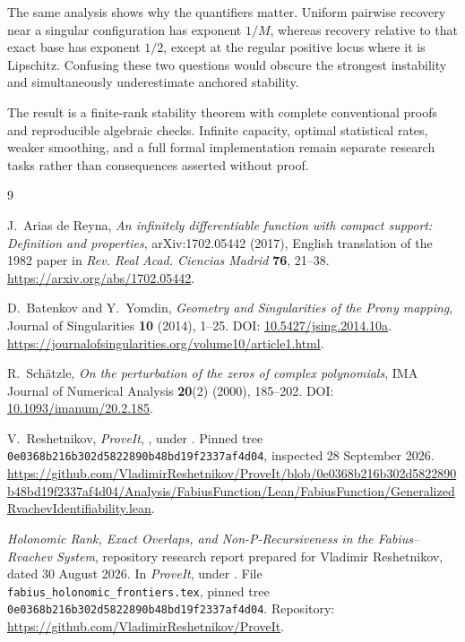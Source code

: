 \documentclass[11pt,a4paper]{article}
\numberwithin{equation}{section}
\theoremstyle{definition}
\theoremstyle{remark}
\begin{document}
The same analysis shows why the quantifiers matter.  Uniform pairwise recovery
near a singular configuration has exponent $1/M$, whereas recovery relative
to that exact base has exponent $1/2$, except at the regular positive locus where
it is Lipschitz.  Confusing these two questions would obscure the strongest
instability and simultaneously underestimate anchored stability.

The result is a finite-rank stability theorem with complete conventional proofs
and reproducible algebraic checks.  Infinite capacity, optimal statistical
rates, weaker smoothing, and a full formal implementation remain separate
research tasks rather than consequences asserted without proof.

\begin{thebibliography}{9}
\raggedright
{}
J.~Arias de Reyna,
\emph{An infinitely differentiable function with compact support: Definition
and properties}, arXiv:1702.05442 (2017), English translation of the 1982 paper
in \emph{Rev. Real Acad. Ciencias Madrid} \textbf{76}, 21--38.
\url{https://arxiv.org/abs/1702.05442}.

D.~Batenkov and Y.~Yomdin,
\emph{Geometry and Singularities of the Prony mapping},
Journal of Singularities \textbf{10} (2014), 1--25.
DOI: \href{https://doi.org/10.5427/jsing.2014.10a}{10.5427/jsing.2014.10a}.
\url{https://journalofsingularities.org/volume10/article1.html}.

R.~Sch\"atzle,
\emph{On the perturbation of the zeros of complex polynomials},
IMA Journal of Numerical Analysis \textbf{20}(2) (2000), 185--202.
DOI: \href{https://doi.org/10.1093/imanum/20.2.185}{10.1093/imanum/20.2.185}.

V.~Reshetnikov, \emph{ProveIt},
, under
.
Pinned tree \texttt{0e0368b216b302d5822890b48bd19f2337af4d04}, inspected
28 September 2026.
\url{https://github.com/VladimirReshetnikov/ProveIt/blob/0e0368b216b302d5822890b48bd19f2337af4d04/Analysis/FabiusFunction/Lean/FabiusFunction/GeneralizedRvachevIdentifiability.lean}.

\emph{Holonomic Rank, Exact Overlaps, and Non-P-Recursiveness in the
Fabius--Rvachev System}, repository research report prepared for
Vladimir Reshetnikov, dated 30 August 2026.
In \emph{ProveIt}, under
.
File \texttt{fabius\_holonomic\_frontiers.tex}, pinned tree
\texttt{0e0368b216b302d5822890b48bd19f2337af4d04}.
Repository: \url{https://github.com/VladimirReshetnikov/ProveIt}.
\end{thebibliography}
\end{document}

